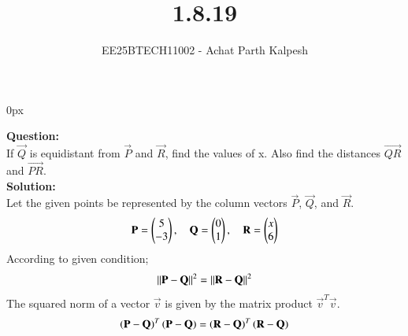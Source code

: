 \documentclass[journal]{IEEEtran}
\begin{document}

\title{1.8.19}
\author{EE25BTECH11002 - Achat Parth Kalpesh }
{\let\newpage\relax\maketitle}
\renewcommand{\thefigure}{\theenumi}
\renewcommand{\thetable}{\theenumi}
\setlength{\intextsep}{10pt} %
\renewcommand{\thetable}{\theenumi}
\parindent 0px


\textbf{Question:}\\
If $\vec{Q}$ is equidistant from $\vec{P}$ and $\vec{R}$, find the values of x. Also find the distances $\vec{QR}$ and $\vec{PR}$.\\

\textbf{Solution:}\\

Let the given points be represented by the column vectors $\vec{P}$, $\vec{Q}$, and $\vec{R}$.
\begin{align}
    \mathbf{P} = \begin{pmatrix}5 \\ -3\end{pmatrix}, \quad \mathbf{Q} = \begin{pmatrix}0 \\ 1\end{pmatrix}, \quad \mathbf{R} = \begin{pmatrix}x \\ 6\end{pmatrix}
\end{align}
According to given condition;
\begin{align}
\left\lVert\mathbf{P} - \mathbf{Q}\right\rVert^2 = \left\lVert\mathbf{R} - \mathbf{Q}\right\rVert^2
\end{align}
The squared norm of a vector $\vec{v}$ is given by the matrix product $\vec{v}^T\vec{v}$.
\begin{align}
\left(\mathbf{P} - \mathbf{Q}\right)^T \left(\mathbf{P} - \mathbf{Q}\right) = \left(\mathbf{R} - \mathbf{Q}\right)^T \left(\mathbf{R} - \mathbf{Q}\right) \label{eq:0.3}
\end{align}
\end{document}
